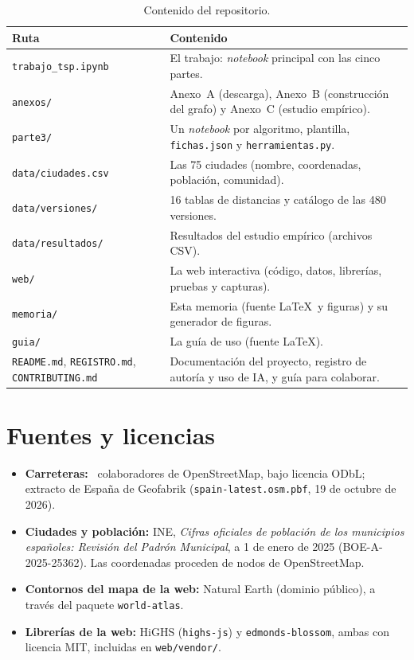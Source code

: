 \begin{table}[htbp]
  \centering
  \caption{Contenido del repositorio.}
  \small
  \begin{tabularx}{\linewidth}{@{}l X@{}}
    \toprule
    Ruta & Contenido \\
    \midrule
    \texttt{trabajo\_tsp.ipynb} & El trabajo: \emph{notebook} principal con las cinco partes. \\
    \texttt{anexos/} & Anexo~A (descarga), Anexo~B (construcción del grafo) y Anexo~C (estudio empírico). \\
    \texttt{parte3/} & Un \emph{notebook} por algoritmo, plantilla, \texttt{fichas.json} y \texttt{herramientas.py}. \\
    \texttt{data/ciudades.csv} & Las 75 ciudades (nombre, coordenadas, población, comunidad). \\
    \texttt{data/versiones/} & 16 tablas de distancias y catálogo de las 480 versiones. \\
    \texttt{data/resultados/} & Resultados del estudio empírico (archivos CSV). \\
    \texttt{web/} & La web interactiva (código, datos, librerías, pruebas y capturas). \\
    \texttt{memoria/} & Esta memoria (fuente \LaTeX\ y figuras) y su generador de figuras. \\
    \texttt{guia/} & La guía de uso (fuente \LaTeX). \\
    \texttt{README.md}, \texttt{REGISTRO.md}, \texttt{CONTRIBUTING.md} & Documentación del proyecto, registro de autoría y uso de IA, y guía para colaborar. \\
    \bottomrule
  \end{tabularx}
\end{table}

\chapter{Fuentes y licencias}\label{ap:licencias}

\begin{itemize}
  \item \textbf{Carreteras:} \textcopyright\ colaboradores de OpenStreetMap, bajo licencia ODbL; extracto de España de Geofabrik (\texttt{spain-latest.osm.pbf}, 19 de octubre de 2026).
  \item \textbf{Ciudades y población:} INE, \emph{Cifras oficiales de población de los municipios españoles: Revisión del Padrón Municipal}, a 1 de enero de 2025 (BOE-A-2025-25362). Las coordenadas proceden de nodos de OpenStreetMap.
  \item \textbf{Contornos del mapa de la web:} Natural Earth (dominio público), a través del paquete \texttt{world-atlas}.
  \item \textbf{Librerías de la web:} HiGHS (\texttt{highs-js}) y \texttt{edmonds-blossom}, ambas con licencia MIT, incluidas en \texttt{web/vendor/}.
\end{itemize}
